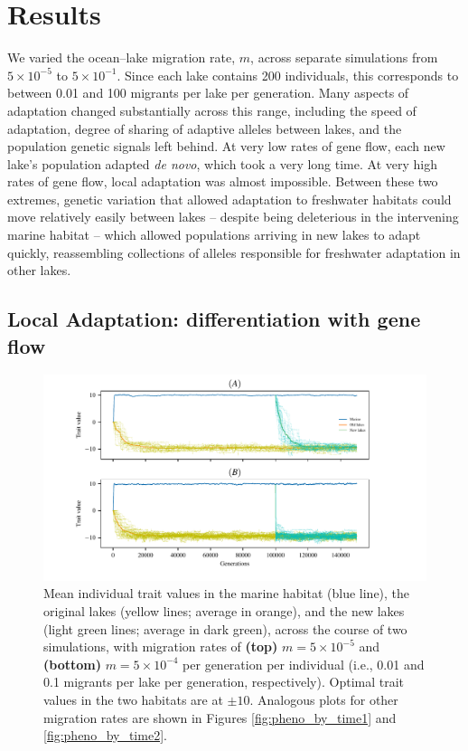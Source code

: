 \documentclass{article}
\begin{document}
\section*{Results}

We varied the ocean--lake migration rate, $m$, 
across separate simulations
from $5 \times 10^{-5}$ to $5 \times 10^{-1}$.
Since each lake contains 200 individuals,
this corresponds to between 0.01 and 100 migrants per lake per generation.
Many aspects of adaptation changed substantially across this range,
including the speed of adaptation,
degree of sharing of adaptive alleles between lakes,
and the population genetic signals left behind.
At very low rates of gene flow,
each new lake's population adapted \emph{de novo},
which took a very long time.
At very high rates of gene flow, local adaptation was almost impossible.
Between these two extremes,
genetic variation that allowed adaptation to freshwater habitats
could move relatively easily between lakes --
despite being deleterious in the intervening marine habitat --
which allowed populations arriving in new lakes to adapt quickly,
reassembling collections of alleles responsible for freshwater adaptation
in other lakes.


\subsection*{Local Adaptation: differentiation with gene flow}

\begin{figure}
	\begin{center}
        \includegraphics{Final_Plots/Pheno_Time.pdf}
  		\caption{ 
        		Mean individual trait values in the marine habitat (blue line),
        		the original lakes (yellow lines; average in orange),
        		and the new lakes (light green lines; average in dark green),
        		across the course of two simulations, with migration rates of
        		\textbf{(top)} $m=5 \times 10^{-5}$ and
        		\textbf{(bottom)} $m=5 \times 10^{-4}$ per generation per individual
        		(i.e., 0.01 and 0.1 migrants per lake per generation, respectively).
        		Optimal trait values in the two habitats are at $\pm 10$.
                Analogous plots for other migration rates
                are shown in Figures \ref{fig:pheno_by_time1} and \ref{fig:pheno_by_time2}.
		}
  		\label{fig:phenotype_ts2}
	\end{center}
\end{figure}
\end{document}
